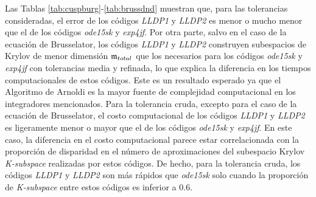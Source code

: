 Las Tablas \ref{tab:cuspburg}-\ref{tab:brussdnd} muestran que, para las tolerancias consideradas, el error de los códigos \emph{LLDP1} y \emph{LLDP2} es menor o mucho menor que el de los códigos \emph{ode15sk} y \emph{exp4jf}. Por otra parte, salvo en el caso de la ecuación de Brusselator, los códigos \emph{LLDP1} y \emph{LLDP2} construyen subespacios de Krylov de menor dimensión $\mathfrak{m}_{total}$ que los necesarios para los códigos \emph{ode15sk } y \emph{exp4jf} con tolerancias media y refinada, lo que explica la diferencia en los tiempos computacionales de estos códigos. Este es un resultado esperado ya que el Algoritmo de Arnoldi es la mayor fuente de complejidad computacional en los integradores mencionados. Para la tolerancia cruda, excepto para el caso de la ecuación de Brusselator, el costo computacional de los códigos \emph{LLDP1} y \emph{LLDP2} es ligeramente menor o mayor que el de los códigos \emph{ode15sk} y \emph{ exp4jf}. En este caso, la diferencia en el costo computacional parece estar correlacionada con la proporción de disparidad en el número de aproximaciones del subespacio Krylov \textit{K-subspace} realizadas por estos códigos. De hecho, para la tolerancia cruda, los códigos \emph{LLDP1} y \emph{LLDP2} son más rápidos que \emph{ode15sk} solo cuando la proporción de \textit{K-subspace} entre estos códigos es inferior a 0.6.

